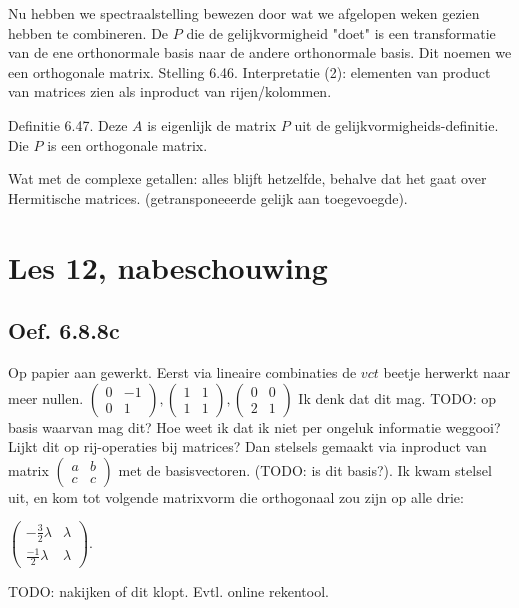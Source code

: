 \documentclass{article}
\begin{document}
Nu hebben we spectraalstelling bewezen door  wat we afgelopen weken 
gezien hebben te combineren. 
De $P$ die de gelijkvormigheid "doet" is een transformatie van de ene orthonormale basis naar de andere orthonormale basis. Dit noemen we een orthogonale matrix. 
Stelling 6.46. Interpretatie (2): elementen van product van matrices zien als inproduct van rijen/kolommen. 

Definitie 6.47. Deze $A$ is eigenlijk de matrix $P$ uit de gelijkvormigheids-definitie. Die $P$ is een orthogonale matrix. 

Wat met de complexe getallen: alles blijft hetzelfde, behalve dat het gaat over Hermitische matrices. (getransponeeerde gelijk aan toegevoegde). 


\section*{Les 12, nabeschouwing}

\subsection{Oef. 6.8.8c}

Op papier aan gewerkt. 
Eerst via lineaire combinaties de $vct$ beetje herwerkt naar meer nullen. 
$\begin{pmatrix}0&-1\\0&1 \end{pmatrix}, \begin{pmatrix}1&1\\1&1 \end{pmatrix}, \begin{pmatrix}0&0\\2&1 \end{pmatrix}$
Ik denk dat dit mag. TODO: op basis waarvan mag dit? Hoe weet ik dat ik niet per ongeluk informatie weggooi? Lijkt dit op rij-operaties bij matrices? 
Dan stelsels gemaakt via inproduct van matrix $\begin{pmatrix}a&b\\c&c \end{pmatrix}$ met de basisvectoren. (TODO: is dit basis?). Ik kwam stelsel uit, en kom tot volgende matrixvorm die orthogonaal zou zijn op alle drie: 

 $\begin{pmatrix}-\frac{3}{2} \lambda&\lambda\\ \frac{-1}{2}\lambda & \lambda \end{pmatrix}$. 

 TODO: nakijken of dit klopt. Evtl. online rekentool. 
\end{document}
